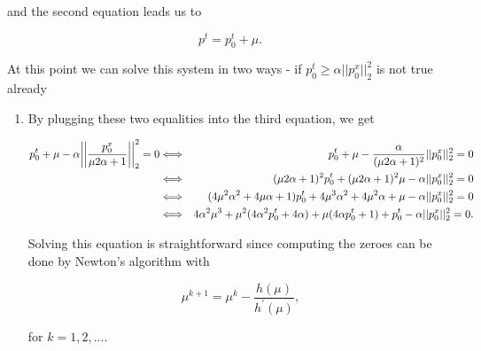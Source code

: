         and the second equation leads us to

        \begin{equation}
            p^{t} = p_{0}^{t} + \mu. \label{eq:2ndequ}
        \end{equation}

        At this point we can solve this system in two ways - if $p_{0}^{t} \ge \alpha ||p_{0}^{x}||_{2}^{2}$ is not true already
        \begin{enumerate}
            \item By plugging these two equalities into the third equation, we get

        \begin{eqnarray}
            p_{0}^{t} + \mu - \alpha \bigg|\bigg|\frac{p_{0}^{x}}{\mu 2 \alpha + 1}\bigg|\bigg|_{2}^{2} = 0 &\Longleftrightarrow& p_{0}^{t} + \mu - \frac{\alpha}{(\mu 2 \alpha + 1)^{2}} ||p_{0}^{x}||_{2}^{2} = 0 \notag \\
            &\Longleftrightarrow& (\mu 2 \alpha + 1)^{2} p_{0}^{t} + (\mu 2 \alpha + 1)^{2} \mu - \alpha ||p_{0}^{x}||_{2}^{2} = 0 \notag \\
            &\Longleftrightarrow& (4 \mu^{2} \alpha^{2} + 4 \mu \alpha + 1) p_{0}^{t} + 4 \mu^{3} \alpha^{2} + 4 \mu^{2} \alpha + \mu - \alpha ||p_{0}^{x}||_{2}^{2} = 0 \notag \\
            &\Longleftrightarrow& 4 \alpha^{2} \mu^{3} + \mu^{2} (4 \alpha^{2} p_{0}^{t} + 4 \alpha) + \mu (4 \alpha p_{0}^{t} + 1) + p_{0}^{t} - \alpha ||p_{0}^{x}||_{2}^{2} = 0. \notag
        \end{eqnarray}

        Solving this equation is straightforward since computing the zeroes can be done by Newton's algorithm with

        \begin{equation}
            \mu^{k+1} = \mu^{k} - \frac{h(\mu)}{h^{'}(\mu)}, \label{eq:newton}
        \end{equation}

        for $k = 1, 2, ...$.


\end{enumerate}
